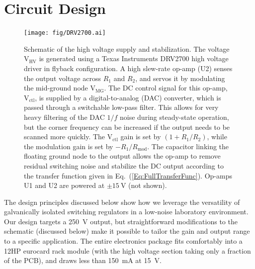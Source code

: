 \documentclass[aip,rsi,reprint]{revtex4-1} %
\begin{document}
\section{Circuit Design}
\label{Sec:Circuit}

\begin{figure}[t]
\texttt{[image: fig/DRV2700.ai]}
\caption{Schematic of the high voltage supply and stabilization.
The voltage $\text{V}_\text{HV}$ is generated using a Texas Instruments DRV2700 high voltage driver in flyback configuration.
A high slew-rate op-amp (U2) senses the output voltage across $R_1$ and $R_2$, and servos it by modulating the mid-ground node $\text{V}_\text{MG}$.
The DC control signal for this op-amp,  $\text{V}_{\text{ctl}}$, is supplied by a digital-to-analog (DAC) converter, which is passed through a switchable low-pass filter. This allows for very heavy filtering of the DAC $1/f$ noise during steady-state operation, but the corner frequency can be increased if the output needs to be scanned more quickly.
The $\text{V}_{\text{ctl}}$ gain is set by $\left(1+R_1/R_2\right)$, while the modulation gain is set by $-R_1/R_\text{mod}$.
The capacitor linking the floating ground node to the output allows the op-amp to remove residual switching noise and stabilize the DC output according to the transfer function given in Eq.~(\ref{Eq:FullTransferFunc}).
Op-amps U1 and U2 are powered at $\pm\SI{15}{\volt}$ (not shown).
\label{Fig:PiezoCircuit}}
\end{figure}

The design principles discussed below show how we leverage the versatility of galvanically isolated switching regulators in a low-noise laboratory environment. 
Our design targets a \SI{250}{\volt} output, but straightforward modifications to the schematic (discussed below) make it possible to tailor the gain and output range to a specific application.
The entire electronics package fits comfortably into a 12HP eurocard rack module (with the high voltage section taking only a fraction of the PCB), and draws less than \SI{150}{\milli\ampere} at \SI{15}{\volt}.
\end{document}
